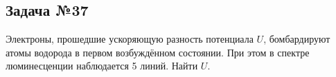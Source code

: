 \subsection{Задача №37}

Электроны, прошедшие ускоряющую разность потенциала $U$, бомбардируют атомы водорода в первом возбуждённом состоянии. При этом в спектре люминесценции наблюдается 5 линий. Найти $U$.